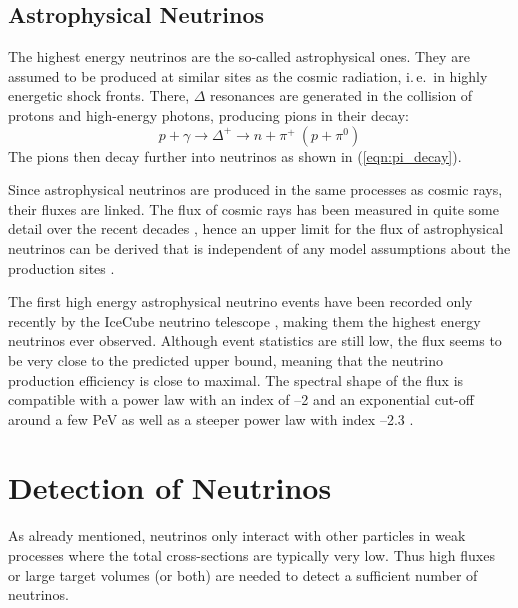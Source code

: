 
\subsection{Astrophysical Neutrinos}

The highest energy neutrinos are the so-called astrophysical ones. They are  
assumed to be produced at similar sites as the cosmic radiation, i.\,e.\ in 
highly energetic shock fronts. There, $\Delta$ resonances are generated in the 
collision of protons and high-energy photons, producing pions in their decay:
\begin{equation}
 p + \gamma \to \Delta^+ \to n + \pi^+\ (p + \pi^0)
\end{equation}
The pions then decay further into neutrinos as shown in (\ref{eqn:pi_decay}).

Since astrophysical neutrinos are produced in the same processes as cosmic 
rays, their fluxes are linked. The flux of cosmic rays has been measured in 
quite some detail over the recent decades \cite{CosmRaySpec}, hence an upper 
limit for the flux of astrophysical neutrinos can be derived that is 
independent of any model assumptions about the production sites \cite{WB_bound}.

The first high energy astrophysical neutrino events have been recorded only
recently by the IceCube neutrino telescope \cite{HESE, HESE_3yr}, making them
the  highest energy neutrinos ever observed. Although event statistics are
still low, the flux seems to be very close to the predicted upper bound, meaning
that  the neutrino production efficiency is close to maximal. The spectral shape
of the flux is compatible with a power law with an index of --2 and an
exponential cut-off around a few PeV as well as a steeper
power law with index --2.3 \cite{Lars_globalfit}.

\section{Detection of Neutrinos}
\label{sec:NuDetection}

As already mentioned, neutrinos only interact with other particles in weak
processes where the total cross-sections are typically very low. Thus high
fluxes or large target volumes (or both) are needed to detect a sufficient
number of neutrinos.


